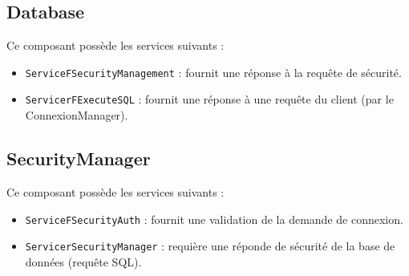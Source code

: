 \subsection{Database}
Ce composant possède les services suivants : 
\begin{itemize}
\item 
  \verb+ServiceFSecurityManagement+ :  fournit une réponse à la requête de sécurité.
\item 
  \verb+ServicerFExecuteSQL+ :  fournit une réponse à une requête du client (par le ConnexionManager).
\end{itemize}

\subsection{SecurityManager}
Ce composant possède les services suivants : 
\begin{itemize}
\item 
  \verb+ServiceFSecurityAuth+ : fournit une validation de la demande de connexion.
\item 
  \verb+ServicerSecurityManager+ :  requière une réponde de sécurité de la base de données (requête SQL).
\end{itemize}

